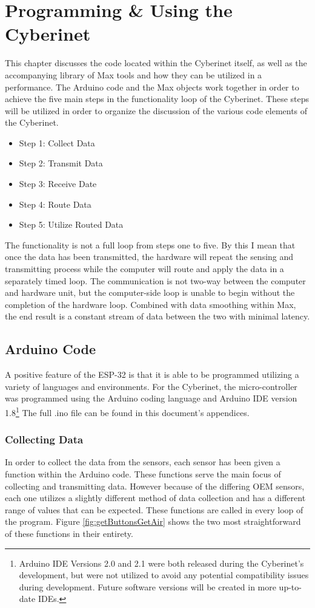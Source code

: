 \chapter{Programming \& Using the Cyberinet}
This chapter discusses the code located within the Cyberinet itself, as well as the accompanying library of Max tools and how they can be utilized in a performance. The Arduino code and the Max objects work together in order to achieve the five main steps in the functionality loop of the Cyberinet. These steps will be utilized in order to organize the discussion of the various code elements of the Cyberinet.

\begin{itemize}
    \item Step 1: Collect Data
    \item Step 2: Transmit Data
    \item Step 3: Receive Date
    \item Step 4: Route Data
    \item Step 5: Utilize Routed Data
\end{itemize}

The functionality is not a full loop from steps one to five. By this I mean that once the data has been transmitted, the hardware will repeat the sensing and transmitting process while the computer will route and apply the data in a separately timed loop. The communication is not two-way between the computer and hardware unit, but the computer-side loop is unable to begin without the completion of the hardware loop. Combined with data smoothing within Max, the end result is a constant stream of data between the two with minimal latency.

\section{Arduino Code}
A positive feature of the ESP-32 is that it is able to be programmed utilizing a variety of languages and environments. For the Cyberinet, the micro-controller was programmed using the Arduino coding language and Arduino IDE version 1.8\footnote{Arduino IDE Versions 2.0 and 2.1 were both released during the Cyberinet's development, but were not utilized to avoid any potential compatibility issues during development. Future software versions will be created in more up-to-date IDEs.} The full .ino file can be found in this document's appendices.

\subsection{Collecting Data}
In order to collect the data from the sensors, each sensor has been given a function within the Arduino code. These functions serve the main focus of collecting and transmitting data. However because of the differing OEM sensors, each one utilizes a slightly different method of data collection and has a different range of values that can be expected. These functions are called in every loop of the program. Figure \ref{fig:getButtonsGetAir} shows the two most straightforward of these functions in their entirety.

